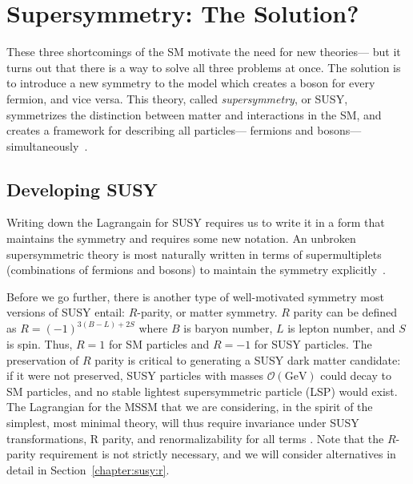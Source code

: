 \section{Supersymmetry: The Solution?}


These three shortcomings of the SM motivate the need for new theories--- but it turns out that there is a way to solve all three problems at once. The solution is to introduce a new symmetry to the model which creates a boson for every fermion, and vice versa. This theory, called \textit{supersymmetry}, or SUSY, symmetrizes the distinction between matter and interactions in the SM, and creates a framework for describing all particles--- fermions and bosons--- simultaneously~\cite{Martin1997,susypheno}.


\subsection{Developing SUSY} 

\label{chapter:susy:susy:developing}

Writing down the Lagrangain for SUSY requires us to write it in a form that maintains the symmetry and requires some new notation. An unbroken supersymmetric theory is most naturally written in terms of supermultiplets (combinations of fermions and bosons) to maintain the symmetry explicitly~\cite{Jungman}. 

Before we go further, there is another type of well-motivated symmetry most versions of SUSY entail: $R$-parity, or matter symmetry\cite{Jungman}. $R$ parity can be defined as $R = (-1)^{3(B-L)+2S}$ where $B$ is baryon number, $L$ is lepton number, and $S$ is spin. Thus, $R = 1$ for SM particles and $R = -1$ for SUSY particles. The preservation of $R$ parity is critical to generating a SUSY dark matter candidate: if it were not preserved, SUSY particles with masses $\mathcal{O}(\mathrm{GeV})$ could decay to SM particles, and no stable lightest supersymmetric particle (LSP) would exist. The Lagrangian for the MSSM that we are considering, in the spirit of the simplest, most minimal theory, will thus require invariance under SUSY transformations, R parity, and renormalizability for all terms \cite{Jungman}. Note that the $R$-parity requirement is not strictly necessary, and we will consider alternatives in detail in Section~\ref{chapter:susy:r}.


